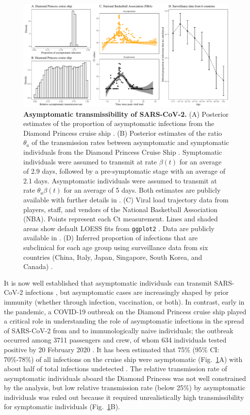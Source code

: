 \documentclass[12pt]{article}
\newcommand{\fref}[1]{Fig.~\ref{fig:#1}}
\begin{document}
\begin{figure}[!ht]
\includegraphics[width=\textwidth]{figure_evidence.ggp.pdf}
\caption{
\textbf{Asymptomatic transmissibility of SARS-CoV-2.}
(A) Posterior estimates of the proportion of asymptomatic infections from the Diamond Princess cruise ship \cite{emery2020}.
(B) Posterior estimates of the ratio $\theta_a$ of the transmission rates between asymptomatic and symptomatic individuals from the Diamond Princess Cruise Ship \cite{emery2020}.
Symptomatic individuals were assumed to transmit at rate $\beta(t)$ for an average of 2.9 days, followed by a pre-symptomatic stage with an average of 2.1 days. 
Asymptomatic individuals were assumed to transmit at rate $\theta_a \beta(t)$ for an average of 5 days.
Both estimates are publicly available with further details in \cite{emery2020}.
(C) Viral load trajectory data from players, staff, and vendors of the National Basketball Association (NBA).
Points represent each Ct measurement.
Lines and shaded areas show default LOESS fits from \texttt{ggplot2} \cite{ggplot2}.
Data are publicly available in \cite{Kissler2020}.
(D) Inferred proportion of infections that are subclinical for each age group using surveillance data from six countries (China, Italy, Japan, Singapore, South Korea, and Canada) \cite{davies2020}.
}
\label{fig:evidence}
\end{figure}

It is now well established that asymptomatic individuals can transmit SARS-CoV-2 infections \citep{gao2021role,johansson2021sars,subramanian2021quantifying,koelle2022changing,lizewski2022navy}, but asymptomatic cases are increasingly shaped by prior immunity (whether through infection, vaccination, or both).
In contrast, early in the pandemic, a COVID-19 outbreak on the Diamond Princess cruise ship played a critical role in understanding the role of asymptomatic infections in the spread of SARS-CoV-2 from and to immunologically naive individuals; the outbreak occurred among 3711 passengers and crew, of whom 634 individuals tested positive by 20 February 2020 \cite{mizumoto2020estimating}.
It has been estimated that 75\% (95\% CI: 70\%-78\%) of all infections on the cruise ship were asymptomatic (\fref{evidence}A) with about half of total infections undetected \cite{emery2020}.
The relative transmission rate of asymptomatic individuals aboard the Diamond Princess was not well constrained by the analysis, but low relative transmission rate (below 25\%) by asymptomatic individuals was ruled out because it required unrealistically high transmissibility for symptomatic individuals (\fref{evidence}B).
\end{document}
